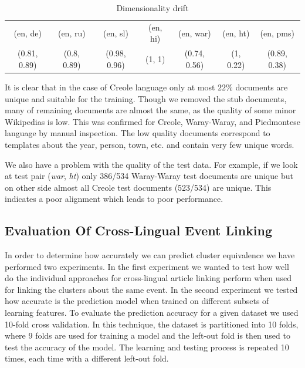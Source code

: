 \documentclass[twoside,11pt]{article}
\begin{document}
{\begin{table}[h]
\caption{Dimensionality drift}
\label{table:rank}
\begin{tabular}{|c|c|c|c|c|c|c|}
\cline{1-7}
(en, de)     &   (en, ru)     &   (en, sl)       &     (en, hi)&   (en, war)      &      (en, ht) &   (en, pms)\\
\cline{1-7}
(0.81, 0.89)   &  (0.8, 0.89)  &   (0.98, 0.96)    &    (1, 1)  &   (0.74, 0.56)  &      (1, 0.22)  &   (0.89, 0.38)\\
\cline{1-7}
\end{tabular}
\end{table}

It is clear that in the case of Creole language only at most $22\%$ documents are unique and suitable for the training. Though we removed the stub documents, many of remaining documents are almost the same, as the quality of some minor Wikipedias is low. This was confirmed for Creole, Waray-Waray, and Piedmontese language by manual inspection. The low quality documents correspond to templates about the year, person, town, etc. and contain very few unique words.

We also have a problem with the quality of the test data. For example, if we look at test pair (\emph{war}, \emph{ht}) only 386/534 Waray-Waray test documents are unique but on other side almost all Creole test documents (523/534) are unique. This indicates a poor alignment which leads to poor performance.
}

\subsection{Evaluation Of Cross-Lingual Event Linking}

In order to determine how accurately we can predict cluster equivalence we have performed two experiments. In the first experiment we wanted to test how well do the individual approaches for cross-lingual article linking perform when used for linking the clusters about the same event. In the second experiment we tested how accurate is the prediction model when trained on different subsets of learning features. To evaluate the prediction accuracy for a given dataset we used 10-fold cross validation. In this technique, the dataset is partitioned into 10 folds, where 9 folds are used for training a model and the left-out fold is then used to test the accuracy of the model. The learning and testing process is repeated 10 times, each time with a different left-out fold.
\end{document}
